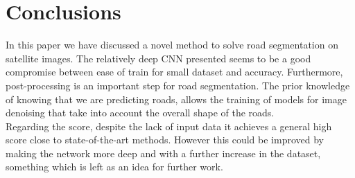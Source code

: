 \documentclass[10pt,conference,compsocconf]{IEEEtran}
\begin{document}
\section{Conclusions}
\label{sec:conclusions}
In this paper we have discussed a novel method to solve road segmentation on satellite images. The relatively deep CNN presented seems to be a good compromise between ease of train for small dataset and accuracy. Furthermore, post-processing is an important step for road segmentation. The prior knowledge of knowing that we are predicting roads, allows the training of models for image denoising that take into account the overall shape of the roads.\\
Regarding the score, despite the lack of input data it achieves a general high score close to state-of-the-art methods. However this could be improved by making the network more deep and with a further increase in the dataset, something which is left as an idea for further work.






\end{document}
